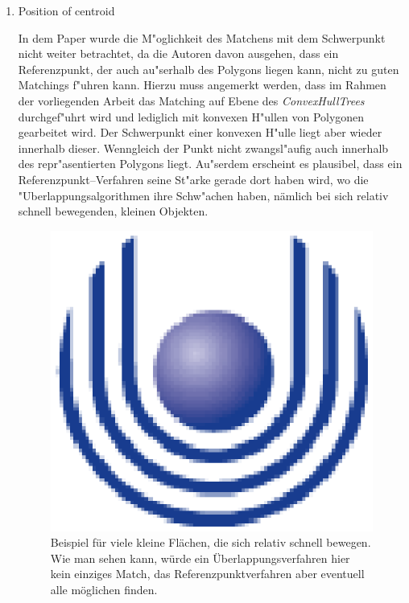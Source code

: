 \begin{enumerate}
\item Position of centroid

In dem Paper wurde die M"oglichkeit des Matchens mit dem Schwerpunkt nicht weiter betrachtet, da die Autoren davon ausgehen, dass ein Referenzpunkt, der auch au"serhalb des Polygons liegen kann, nicht zu guten Matchings f"uhren kann. Hierzu muss angemerkt werden, dass im Rahmen der vorliegenden Arbeit das Matching auf Ebene des \textit{ConvexHullTrees} durchgef"uhrt wird und lediglich mit konvexen H"ullen von Polygonen gearbeitet wird. Der Schwerpunkt einer konvexen H"ulle liegt aber wieder innerhalb dieser. Wenngleich der Punkt nicht zwangsl"aufig auch innerhalb des repr"asentierten Polygons liegt. Au"serdem erscheint es plausibel, dass ein Referenzpunkt--Verfahren seine St"arke gerade dort haben wird, wo die "Uberlappungsalgorithmen ihre Schw"achen haben, nämlich bei sich relativ schnell bewegenden, kleinen Objekten.

\begin{figure}
	\centering
	\includegraphics{feu_logo2.eps}
	\caption[Beispiel für den Vorteil von Referenzpunktverfahren]{Beispiel für viele kleine Flächen, die sich relativ schnell bewegen. Wie man sehen kann, würde ein Überlappungsverfahren hier kein einziges Match, das Referenzpunktverfahren aber eventuell alle möglichen finden.}
	\label{fig:SchnelleBewegung}
\end{figure}



\end{enumerate}
